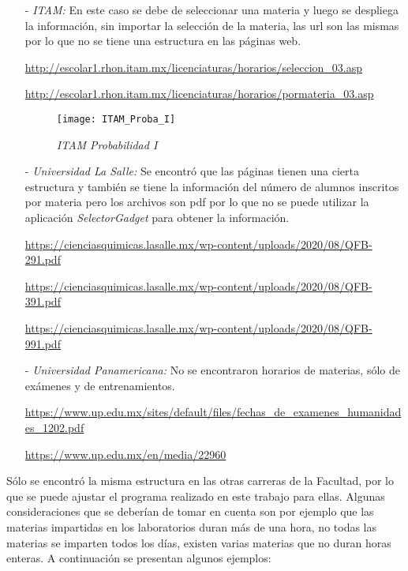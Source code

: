 \begin{itemize}
\item[-] \textit{ITAM:} En este caso se debe de seleccionar una materia y luego se despliega la información, sin importar la selección de la materia, las url son las mismas por lo que no se tiene una estructura en las páginas web.

\url{http://escolar1.rhon.itam.mx/licenciaturas/horarios/seleccion_03.asp}

\url{http://escolar1.rhon.itam.mx/licenciaturas/horarios/pormateria_03.asp}

\begin{figure}[H]
\centering
\texttt{[image: ITAM\_Proba\_I]} %
\caption{\textit{ITAM Probabilidad I}}
\end{figure}


\item[-] \textit{Universidad La Salle:} Se encontró que las páginas tienen una cierta estructura y también se tiene la información del número de alumnos inscritos por materia pero los archivos son pdf por lo que no se puede utilizar la aplicación \textit{SelectorGadget} para obtener la información.

\url{https://cienciasquimicas.lasalle.mx/wp-content/uploads/2020/08/QFB-291.pdf}

\url{https://cienciasquimicas.lasalle.mx/wp-content/uploads/2020/08/QFB-391.pdf}

\url{https://cienciasquimicas.lasalle.mx/wp-content/uploads/2020/08/QFB-991.pdf}


\item[-] \textit{Universidad Panamericana:} No se encontraron horarios de materias, sólo de exámenes y de entrenamientos.

\url{https://www.up.edu.mx/sites/default/files/fechas_de_examenes_humanidades_1202.pdf}

\url{https://www.up.edu.mx/en/media/22960}

\end{itemize}

Sólo se encontró la misma estructura en las otras carreras de la Facultad, por lo que se puede ajustar el programa realizado en este trabajo para ellas. Algunas consideraciones que se deberían de tomar en cuenta son por ejemplo que las materias impartidas en los laboratorios duran más de una hora, no todas las materias se imparten todos los días, existen varias materias que no duran horas enteras. A continuación se presentan algunos ejemplos:

